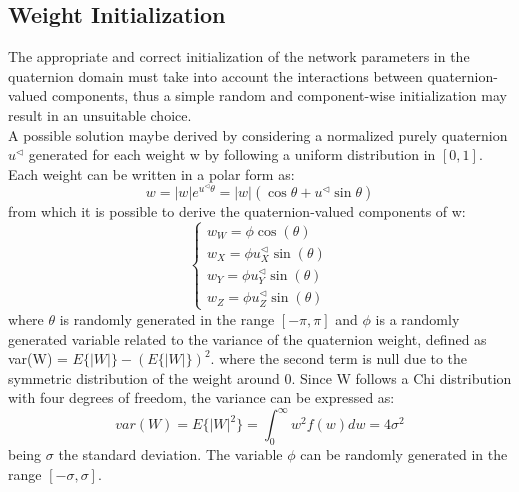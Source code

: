 \documentclass{article}
\begin{document}
    \subsection{Weight Initialization}
    The appropriate and correct initialization of the network parameters in the quaternion domain must take into account the
    interactions between quaternion-valued components,  thus a simple random and component-wise initialization may result in an 
    unsuitable choice. 
    \\ A possible solution maybe derived by considering a normalized purely quaternion  $u^\triangleleft$ generated for each weight w 
    by following a uniform distribution in $[0,1]$. 
    \\ Each weight can be written in a polar form as:
    \begin{equation*}
        w= |w|e^{u^\triangleleft \theta} = |w| (\cos{\theta} + u^\triangleleft \sin{\theta}) 
    \end{equation*}
    from which it is possible to derive the quaternion-valued components of w:
    \begin{equation*}
        \begin{cases}
            w_W = \phi \cos{(\theta)} \\
            w_X = \phi u_X^\triangleleft\sin{(\theta)} \\
            w_Y = \phi u_Y^\triangleleft\sin{(\theta)} \\
            w_Z = \phi u_Z^\triangleleft\sin{(\theta)}
        \end{cases}
    \end{equation*}
    where $\theta$ is randomly generated in the range $[-\pi, \pi]$ and $\phi$ is a randomly generated variable related to the variance
    of the quaternion weight, defined as var(W) = $E\{|W|\} - (E\{|W|\})^2 $. where  the second term is null due to the symmetric distribution
    of the weight around 0. Since W follows a Chi distribution with four degrees of freedom, the variance can be expressed as:
    \begin{equation*}
        var(W)=E\{|W|^2\}= \int_0^\infty w^2f(w) dw = 4 \sigma^2
    \end{equation*}
    being $\sigma$ the standard deviation. The variable $\phi$ can be randomly generated in the range $[-\sigma, \sigma]$.
\end{document}
